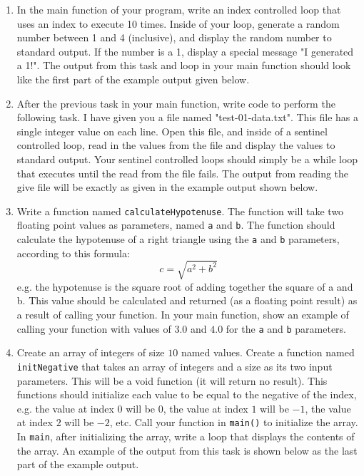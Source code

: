 \documentclass[11pt]{article}
\begin{document}
\begin{enumerate}
\item In the main function of your program, write an index controlled
loop that uses an index to execute 10 times.  Inside of your loop,
generate a random number between 1 and 4 (inclusive), and display
the random number to standard output.  If the number is a 1,
display a special message "I generated a 1!".  The output from this
task and loop in your main function should look like the first part
of the example output given below.

\item After the previous task in your main function, write code to
perform the following task.  I have given you a file named
"test-01-data.txt".  This file has a single integer value on each
line.  Open this file, and inside of a sentinel controlled loop,
read in the values from the file and display the values to standard
output.  Your sentinel controlled loops should simply be a while
loop that executes until the read from the file fails.  The output
from reading the give file will be exactly as given in the example
output shown below.

\item Write a function named \verb~calculateHypotenuse~.  The function will
take two floating point values as parameters, named \verb~a~ and \verb~b~.
The function should calculate the hypotenuse of a right triangle
using the \verb~a~ and \verb~b~ parameters, according to this formula: $$ c =
   \sqrt{a^2 + b^2} $$ e.g. the hypotenuse is the square root of
adding together the square of a and b.  This value should be
calculated and returned (as a floating point result) as a result of
calling your function.  In your main function, show an example of
calling your function with values of $3.0$ and $4.0$ for the \verb~a~
and \verb~b~ parameters.

\item Create an array of integers of size $10$ named values.  Create a
function named \verb~initNegative~ that takes an array of integers and a
size as its two input parameters.  This will be a void function (it
will return no result).  This functions should initialize each
value to be equal to the negative of the index, e.g. the value at
index $0$ will be $0$, the value at index $1$ will be $-1$, the
value at index $2$ will be $-2$, etc.  Call your function in
\verb~main()~ to initialize the array.  In \verb~main~, after initializing
the array, write a loop that displays the contents of the array.
An example of the output from this task is shown below as the last
part of the example output.
\end{enumerate}
\end{document}
